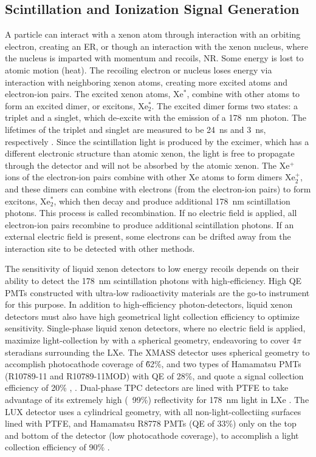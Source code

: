 \subsection{Scintillation and Ionization Signal Generation}
\label{sec:signal_generation}
A particle can interact with a xenon atom through interaction with an orbiting electron, creating an \ac{ER}, or though an interaction with the xenon nucleus, where the nucleus is imparted with momentum and recoils, \ac{NR}. Some energy is lost to atomic motion (heat). The recoiling electron or nucleus loses energy via interaction with neighboring xenon atoms, creating more excited atoms and electron-ion pairs. The excited xenon atoms, Xe$^{*}$, combine with other atoms to form an excited dimer, or excitons, Xe$_{2}^{*}$. The excited dimer forms two states: a triplet and a singlet, which de-excite with the emission of a 178~nm photon. The lifetimes of the triplet and singlet are measured to be 24~ns and 3~ns, respectively \cite{Mock2014}. Since the scintillation light is produced by the excimer, which has a different electronic structure than atomic xenon, the light is free to propagate through the detector and will not be absorbed by the atomic xenon. The Xe$^{+}$ ions of the electron-ion pairs combine with other Xe atoms to form dimers Xe$_{2}^{+}$, and these dimers can combine with electrons (from the electron-ion pairs) to form excitons, Xe$_{2}^{*}$, which then decay and produce additional 178~nm scintillation photons. This process is called recombination. If no electric field is applied, all electron-ion pairs recombine to produce additional scintillation photons. If an external electric field is present, some electrons can be drifted away from the interaction site to be detected with other methods. 

The sensitivity of liquid xenon detectors to low energy recoils depends on their ability to detect the 178~nm scintillation photons with high-efficiency. High \ac{QE} \ac{PMT}s constructed with ultra-low radioactivity materials are the go-to instrument for this purpose. In addition to high-efficiency photon-detectors, liquid xenon detectors must also have high geometrical light collection efficiency to optimize sensitivity. Single-phase liquid xenon detectors, where no electric field is applied, maximize light-collection by with a spherical geometry, endeavoring to cover 4$\pi$ steradians surrounding the \ac{LXe}. The XMASS detector uses spherical geometry to accomplish photocathode coverage of \~62\%, and two types of Hamamatsu \ac{PMT}s (R10789-11 and R10789-11MOD) with \ac{QE} of 28\%, and quote a signal collection efficiency of 20\% \cite{Abe2013}, \cite{XMASSCollaboration2018}. Dual-phase \ac{TPC} detectors are lined with \ac{PTFE} to take advantage of its extremely high (~99\%) reflectivity for 178~nm light in \ac{LXe} \cite{Neves2017}. The \ac{LUX} detector uses a cylindrical geometry, with all non-light-collectiing surfaces lined with \ac{PTFE}, and Hamamatsu R8778 \ac{PMT}s (\ac{QE} of 33\%) only on the top and bottom of the detector (low photocathode coverage), to accomplish a light collection efficiency of 90\% \cite{Faham2014}.

